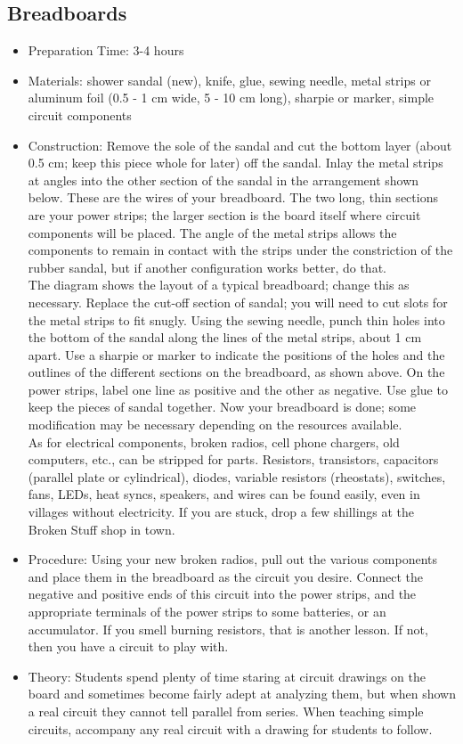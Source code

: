 \subsection{Breadboards}
\begin{itemize}
\item{Preparation Time: 3-4 hours}
\item{Materials: shower sandal (new), knife, glue, sewing needle, metal strips or aluminum foil (0.5 - 1 cm wide, 5 - 10 cm long), sharpie or marker, simple circuit components}
\item{Construction: Remove the sole of the sandal and cut the bottom layer (about 0.5 cm; keep this piece whole for later) off the sandal. Inlay the metal strips at angles into the other section of the sandal in the arrangement shown below. These are the wires of your breadboard. The two long, thin sections are your power strips; the larger section is the board itself where circuit components will be placed. The angle of the metal strips allows the components to remain in contact with the strips under the constriction of the rubber sandal, but if another configuration works better, do that.\\
The diagram shows the layout of a typical breadboard; change this as necessary. Replace the cut-off section of sandal; you will need to cut slots for the metal strips to fit snugly. Using the sewing needle, punch thin holes into the bottom of the sandal along the lines of the metal strips, about 1 cm apart. Use a sharpie or marker to indicate the positions of the holes and the outlines of the different sections on the breadboard, as shown above. On the power strips, label one line as positive and the other as negative. Use glue to keep the pieces of sandal together. Now your breadboard is done; some modification may be necessary depending on the resources available.\\
As for electrical components, broken radios, cell phone chargers, old computers, etc., can be stripped for parts. Resistors, transistors, capacitors (parallel plate or cylindrical), diodes, variable resistors (rheostats), switches, fans, LEDs, heat syncs, speakers, and wires can be found easily, even in villages without electricity. If you are stuck, drop a few shillings at the Broken Stuff shop in town.}
\item{Procedure: Using your new broken radios, pull out the various components and place them in the breadboard as the circuit you desire. Connect the negative and positive ends of this circuit into the power strips, and the appropriate terminals of the power strips to some batteries, or an accumulator. If you smell burning resistors, that is another lesson. If not, then you have a circuit to play with.}
\item{Theory: Students spend plenty of time staring at circuit drawings on the board and sometimes become fairly adept at analyzing them, but when shown a real circuit they cannot tell parallel from series. When teaching simple circuits, accompany any real circuit with a drawing for students to follow.}
\end{itemize}

